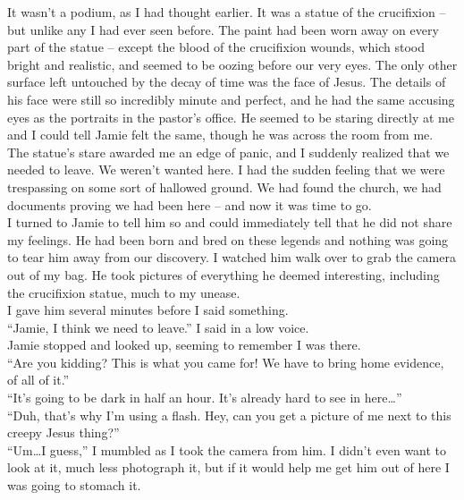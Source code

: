 \documentclass[a5paper]{scrartcl}
\begin{document}
It wasn't a podium, as I had thought earlier. It was a statue of the crucifixion – but unlike any I had ever seen before. The paint had been worn away on every part of the statue – except the blood of the crucifixion wounds, which stood bright and realistic, and seemed to be oozing before our very eyes. The only other surface left untouched by the decay of time was the face of Jesus. The details of his face were still so incredibly minute and perfect, and he had the same accusing eyes as the portraits in the pastor's office. He seemed to be staring directly at me and I could tell Jamie felt the same, though he was across the room from me. \\


The statue's stare awarded me an edge of panic, and I suddenly realized that we needed to leave. We weren't wanted here. I had the sudden feeling that we were trespassing on some sort of hallowed ground. We had found the church, we had documents proving we had been here – and now it was time to go. \\


I turned to Jamie to tell him so and could immediately tell that he did not share my feelings. He had been born and bred on these legends and nothing was going to tear him away from our discovery. I watched him walk over to grab the camera out of my bag. He took pictures of everything he deemed interesting, including the crucifixion statue, much to my unease. \\


I gave him several minutes before I said something.\\


\enquote{Jamie, I think we need to leave.} I said in a low voice.\\


Jamie stopped and looked up, seeming to remember I was there.\\


\enquote{Are you kidding? This is what you came for! We have to bring home evidence, of all of it.}\\


\enquote{It's going to be dark in half an hour. It's already hard to see in here\dots}\\


\enquote{Duh, that's why I'm using a flash. Hey, can you get a picture of me next to this creepy Jesus thing?}\\


\enquote{Um\dots I guess,} I mumbled as I took the camera from him. I didn't even want to look at it, much less photograph it, but if it would help me get him out of here I was going to stomach it. \\
\end{document}

